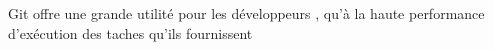 Git offre une grande utilité pour les développeurs , qu'à la haute performance d'exécution des taches qu'ils fournissent